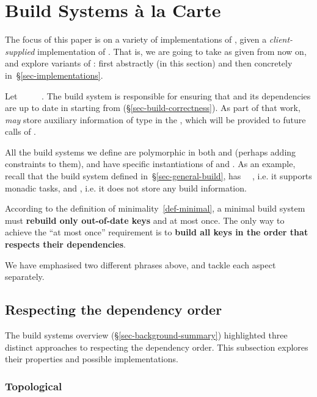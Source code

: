 \section{Build Systems \`a la Carte}\label{sec-build}

The focus of this paper is on a variety of implementations of , given
a \emph{client-supplied} implementation of . That is, we are going to take
 as given from now on, and explore variants of : first
abstractly (in this section) and then concretely in~\S\ref{sec-implementations}.

Let ~\hs{=}~~~~. The build
system  is responsible for ensuring that  and its dependencies
are up to date in  starting from  (\S\ref{sec-build-correctness}). As part of that work,
 \emph{may} store auxiliary information  of type  in
the , which will be provided to future calls of .

All the build systems we define are polymorphic in both  and 
(perhaps adding constraints to them), and have specific instantiations of 
and . As an example, recall that the  build system defined
in~\S\ref{sec-general-build}, has ~\hs{=}~, i.e. it supports
monadic tasks, and , i.e. it does not store any build information.

According to the definition of minimality~\ref{def-minimal}, a minimal build
system must \textbf{rebuild only out-of-date keys} and at most once. The only
way to achieve the ``at most once'' requirement is to \textbf{build all keys in
the order that respects their dependencies}.

We have emphasised two different phrases above, and tackle each aspect separately.

\subsection{Respecting the dependency order}
\label{sec-dependency-orderings}

The build systems overview (\S\ref{sec-background-summary}) highlighted three
distinct approaches to respecting the dependency order. This subsection explores
their properties and possible implementations.

\subsubsection{Topological}


